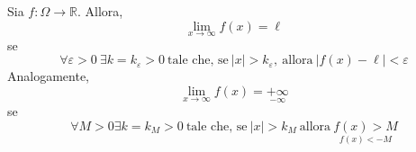 \begin{definition} \label{Def: Limiti all'infinito}
    Sia $f:\Omega \to \mathbb{R}$. Allora, 
    \begin{equation}
        \lim_{x \to \infty}{f(x)}=\ell
    \end{equation}
    se
    \begin{equation}
        \forall \varepsilon > 0 \ \exists k=k_\varepsilon>0 \ \text{tale che, se}\ |x|>k_\varepsilon,\ \text{allora}\ |f(x)-\ell|<\varepsilon
    \end{equation}
    Analogamente,
    \begin{equation}
        \lim_{x \to \infty}{f(x)}=\underset{-\infty}{+\infty}
    \end{equation}
    se 
    \begin{equation}
        \forall M>0 \exists k=k_M>0 \ \text{tale che, se}\ |x|>k_M\ \text{allora}\ \underset{f(x)<-M}{f(x)>M}
    \end{equation}
\end{definition}
